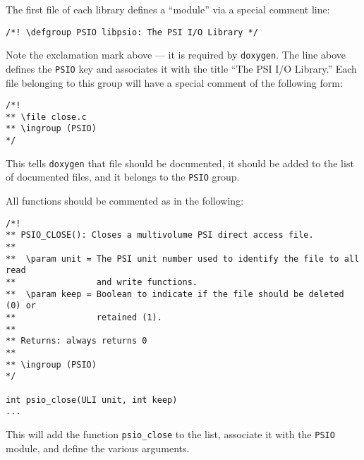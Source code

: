 The first file of each library defines a ``module'' via a special
comment line:
\begin{verbatim}
/*! \defgroup PSIO libpsio: The PSI I/O Library */
\end{verbatim}
Note the exclamation mark above --- it is required by {\tt doxygen}.
The line above defines the {\tt PSIO} key and associates it with the
title ``The PSI I/O Library.'' Each file belonging to this group will
have a special comment of the following form:
\begin{verbatim}
/*!
** \file close.c
** \ingroup (PSIO)
*/
\end{verbatim}
This tells {\tt doxygen} that file  should be
documented, it should be added to the list of documented files, and it
belongs to the {\tt PSIO} group.

All functions should be commented as in the following:
\begin{verbatim}
/*!
** PSIO_CLOSE(): Closes a multivolume PSI direct access file.
**
**  \param unit = The PSI unit number used to identify the file to all read
**                and write functions.
**  \param keep = Boolean to indicate if the file should be deleted (0) or
**                retained (1).
**
** Returns: always returns 0
**
** \ingroup (PSIO)
*/

int psio_close(ULI unit, int keep)
...
\end{verbatim}
This will add the function {\tt psio\_close} to the list, associate it with
the {\tt PSIO} module, and define the various arguments.

